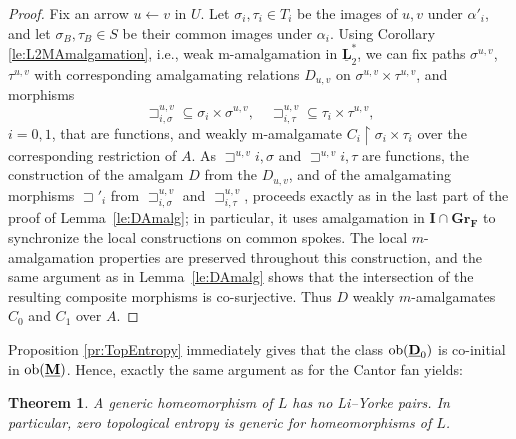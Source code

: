 \documentclass[12pt]{amsart}
\numberwithin{equation}{section}
\theoremstyle{plain}
\newtheorem{theorem}{Theorem}[section]
\newtheorem{proposition}[theorem]{\bf Proposition}
\theoremstyle{definition}
\newcommand{\sqni}{\mathrel{\vphantom{\sqsupset}\text{\mathsurround=0pt\ooalign{$\sqsupset$\cr$-$\cr}}}}
\newcommand \sqsp{\sqsupset}
\newcommand \la{\leftarrow}
\newcommand \tla{\twoheadleftarrow}
\newcommand \ob{{\rm{ob}}}
\newcommand \uhr{\upharpoonright}
\newcommand \GGRFb{\mathbf{Gr_F}}
\newcommand \IIb{\mathbf{I}}
\newcommand \MMb{\mathbf{M}}
\newcommand \DDub{\underline{\mathbf{D}}}
\newcommand \KKub{\underline{\mathbf{K}}}
\newcommand \LLub{\underline{\mathbf{L}}}
\newcommand \MMub{\underline{\mathbf{M}}}
\newcommand \NN{\mathbb{N}}
\begin{document}
\begin{proof}
Fix an arrow $u \la v$ in $U$.  %
Let $\sigma_i,\tau_i\in T_i$ be the images of $u,v$ under $\alpha'_i$, and let
$\sigma_B,\tau_B\in S$ be their common images under $\alpha_i$. 
Using Corollary \ref{le:L2MAmalgamation}, i.e., weak m-amalgamation in $\LLub^*_2$, we can fix paths $\sigma^{u,v}$, $\tau^{u,v}$ with corresponding amalgamating relations $D_{u,v}$ on $\sigma^{u,v} \times \tau^{u,v}$, and morphisms $$\sqsp^{u,v}_{i,\sigma} \subseteq \sigma_i \times \sigma^{u,v}, \quad \sqsp^{u,v}_{i,\tau} \subseteq \tau_i \times \tau^{u,v},$$ $i=0,1$, that are functions, and weakly m-amalgamate $C_i \uhr \sigma_i \times \tau_i$ over the corresponding restriction of $A$.  %
As $\sqsp^{u,v}{i,\sigma}$ and $\sqsp^{u,v}{i,\tau}$ are functions, the construction of the amalgam $D$ from the $D_{u,v}$, and of the amalgamating morphisms $\sqsp'_i$ from $\sqsp^{u,v}_{i,\sigma}$ and $\sqsp^{u,v}_{i,\tau}$, proceeds exactly as in the last part of the proof of Lemma~\ref{le:DAmalg}; in particular, it uses amalgamation in $\IIb\cap\GGRFb$ to synchronize the local constructions on common spokes. The local $m$-amalgamation properties are preserved throughout this construction, and the same argument as in Lemma~\ref{le:DAmalg} shows that the intersection of the resulting composite morphisms is co-surjective. Thus $D$ weakly $m$-amalgamates $C_0$ and $C_1$ over $A$.
\end{proof}

%

Proposition \ref{pr:TopEntropy} immediately gives that the class $\ob(\DDub_0)$ is co-initial in $\ob(\MMub)$. Hence, exactly the same argument as for the Cantor fan yields:

\begin{theorem}
A generic homeomorphism of $L$ has no Li--Yorke pairs. In particular, zero topological entropy is generic for homeomorphisms of $L$.
\end{theorem}

\end{document}
